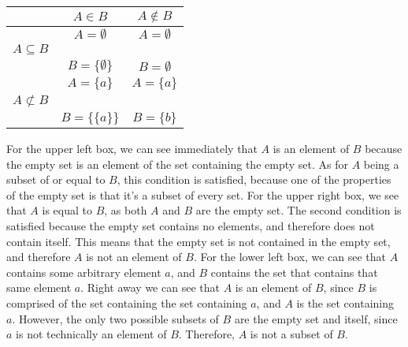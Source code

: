 \documentclass[12pt]{exam}
\begin{document}
\begin{questions}
{\begin{minipage}[t]{14.55cm}
			\begin{center}
			\def\arraystretch{1.3}
				\begin{tabular}{r|c|c}
    				& $A \in B$ & $A \not \in B$ \\
        			\hline
         			& $A = \emptyset$ & $A = \emptyset$ \\
  					$A \subseteq B$ & & \\
            		& $B = \{ \emptyset \}$ & $B = \emptyset$ \\
        			\hline
                 	& $A = \{a\}$ & $A = \{a\}$ \\
  					$A \not \subset B$ & & \\
                 	& $B = \{\{a\}\}$ & $B = \{b\}$ \\
        			\hline
    			\end{tabular}
    			\newline
    			\newline
    			For the upper left box, we can see immediately that $A$ is an element of $B$ because the empty set is an element of the set containing the empty set. As for $A$ being a subset of or equal to $B$, this condition is satisfied, because one of the properties of the empty set is that it's a subset of every set.
    			\newline
    			\newline
    			For the upper right box, we see that $A$ is equal to $B$, as both $A$ and $B$ are the empty set. The second condition is satisfied because the empty set contains no elements, and therefore does not contain itself. This means that the empty set is not contained in the empty set, and therefore $A$ is not an element of $B$.
    			\newline
    			\newline
    			For the lower left box, we can see that $A$ contains some arbitrary element $a$, and $B$ contains the set that contains that same element $a$. Right away we can see that $A$ is an element of $B$, since $B$ is comprised of the set containing the set containing $a$, and $A$ is the set containing $a$. However, the only two possible subsets of $B$ are the empty set and itself, since $a$ is not technically an element of $B$. Therefore, $A$ is not a subset of $B$.
			\end{center}
			
			\vspace{25pt}
			\end{minipage}
		}

\clearpage


\end{questions}
\end{document}
